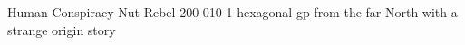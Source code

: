 \filledCS%
  {\currentName}%
  {Human}%
  {Conspiracy Nut}%
  {Rebel}%
  {{2}{0}{0}}%
  {{0}{1}{0}}%
  {%
    \renewcommand\rank{Fodder}
    \renewcommand\characterDebt{100 \glspl{sp}}
    \setcounter{Vigilance}{1}
    \setcounter{Deceit}{1}
    \setcounter{Stealth}{1}
    \setcounter{Projectiles}{2}
    \Dagger
  }%
  {}%
  {1 hexagonal \gls{gp} from the far North with a strange origin story}%

